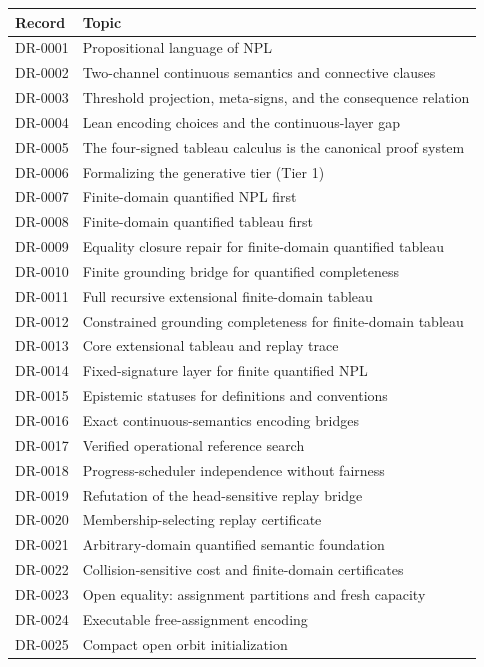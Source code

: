 \small
\begin{longtable}{p{.14\linewidth}p{.79\linewidth}}
\toprule Record & Topic\\\midrule\endhead
DR-0001 & Propositional language of NPL\\
DR-0002 & Two-channel continuous semantics and connective clauses\\
DR-0003 & Threshold projection, meta-signs, and the consequence relation\\
DR-0004 & Lean encoding choices and the continuous-layer gap\\
DR-0005 & The four-signed tableau calculus is the canonical proof system\\
DR-0006 & Formalizing the generative tier (Tier 1)\\
DR-0007 & Finite-domain quantified NPL first\\
DR-0008 & Finite-domain quantified tableau first\\
DR-0009 & Equality closure repair for finite-domain quantified tableau\\
DR-0010 & Finite grounding bridge for quantified completeness\\
DR-0011 & Full recursive extensional finite-domain tableau\\
DR-0012 & Constrained grounding completeness for finite-domain tableau\\
DR-0013 & Core extensional tableau and replay trace\\
DR-0014 & Fixed-signature layer for finite quantified NPL\\
DR-0015 & Epistemic statuses for definitions and conventions\\
DR-0016 & Exact continuous-semantics encoding bridges\\
DR-0017 & Verified operational reference search\\
DR-0018 & Progress-scheduler independence without fairness\\
DR-0019 & Refutation of the head-sensitive replay bridge\\
DR-0020 & Membership-selecting replay certificate\\
DR-0021 & Arbitrary-domain quantified semantic foundation\\
DR-0022 & Collision-sensitive cost and finite-domain certificates\\
DR-0023 & Open equality: assignment partitions and fresh capacity\\
DR-0024 & Executable free-assignment encoding\\
DR-0025 & Compact open orbit initialization\\

\end{longtable}
